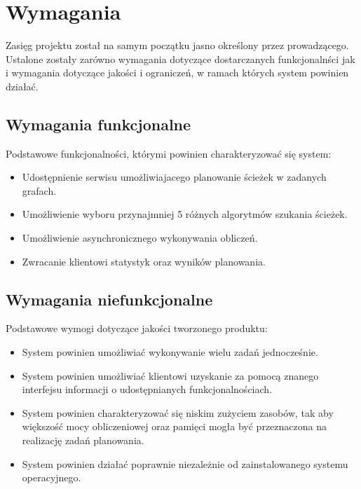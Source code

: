 \chapter{Wymagania}

Zasięg projektu został na samym początku jasno określony przez prowadzącego.
Ustalone zostały zarówno wymagania dotyczące dostarczanych funkcjonalnści jak i wymagania dotyczące jakości i ograniczeń, w ramach których system powinien działać.

\section{Wymagania funkcjonalne}

Podstawowe funkcjonalności, którymi powinien charakteryzować się system:

\begin{itemize}
	\item Udostępnienie serwisu umożliwiajacego planowanie ścieżek w zadanych grafach.
	\item Umożliwienie wyboru przynajmniej 5 różnych algorytmów szukania ścieżek.
	\item Umożliwienie asynchronicznego wykonywania obliczeń.
	\item Zwracanie klientowi statystyk oraz wyników planowania.
\end{itemize}

\section{Wymagania niefunkcjonalne}

Podstawowe wymogi dotyczące jakości tworzonego produktu:

\begin{itemize}
	\item System powinien umożliwiać wykonywanie wielu zadań jednocześnie.
	\item System powinien umożliwiać klientowi uzyskanie za pomocą znanego interfejsu informacji o udostępnianych funkcjonalnościach.
	\item System powinien charakteryzować się niskim zużyciem zasobów, tak aby większość mocy obliczeniowej oraz pamięci mogła być przeznaczona na realizację zadań planowania.
	\item System powinien działać poprawnie niezależnie od zainstalowanego systemu operacyjnego.
\end{itemize}